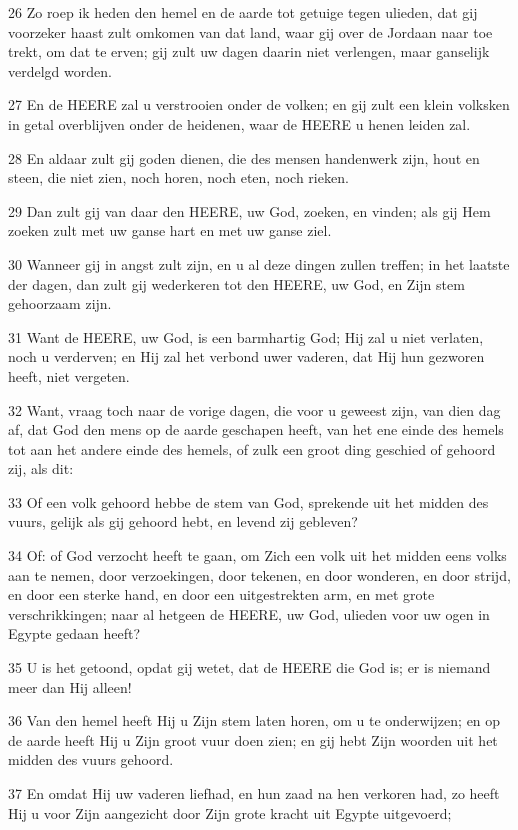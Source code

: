 \par 26 Zo roep ik heden den hemel en de aarde tot getuige tegen ulieden, dat gij voorzeker haast zult omkomen van dat land, waar gij over de Jordaan naar toe trekt, om dat te erven; gij zult uw dagen daarin niet verlengen, maar ganselijk verdelgd worden.
\par 27 En de HEERE zal u verstrooien onder de volken; en gij zult een klein volksken in getal overblijven onder de heidenen, waar de HEERE u henen leiden zal.
\par 28 En aldaar zult gij goden dienen, die des mensen handenwerk zijn, hout en steen, die niet zien, noch horen, noch eten, noch rieken.
\par 29 Dan zult gij van daar den HEERE, uw God, zoeken, en vinden; als gij Hem zoeken zult met uw ganse hart en met uw ganse ziel.
\par 30 Wanneer gij in angst zult zijn, en u al deze dingen zullen treffen; in het laatste der dagen, dan zult gij wederkeren tot den HEERE, uw God, en Zijn stem gehoorzaam zijn.
\par 31 Want de HEERE, uw God, is een barmhartig God; Hij zal u niet verlaten, noch u verderven; en Hij zal het verbond uwer vaderen, dat Hij hun gezworen heeft, niet vergeten.
\par 32 Want, vraag toch naar de vorige dagen, die voor u geweest zijn, van dien dag af, dat God den mens op de aarde geschapen heeft, van het ene einde des hemels tot aan het andere einde des hemels, of zulk een groot ding geschied of gehoord zij, als dit:
\par 33 Of een volk gehoord hebbe de stem van God, sprekende uit het midden des vuurs, gelijk als gij gehoord hebt, en levend zij gebleven?
\par 34 Of: of God verzocht heeft te gaan, om Zich een volk uit het midden eens volks aan te nemen, door verzoekingen, door tekenen, en door wonderen, en door strijd, en door een sterke hand, en door een uitgestrekten arm, en met grote verschrikkingen; naar al hetgeen de HEERE, uw God, ulieden voor uw ogen in Egypte gedaan heeft?
\par 35 U is het getoond, opdat gij wetet, dat de HEERE die God is; er is niemand meer dan Hij alleen!
\par 36 Van den hemel heeft Hij u Zijn stem laten horen, om u te onderwijzen; en op de aarde heeft Hij u Zijn groot vuur doen zien; en gij hebt Zijn woorden uit het midden des vuurs gehoord.
\par 37 En omdat Hij uw vaderen liefhad, en hun zaad na hen verkoren had, zo heeft Hij u voor Zijn aangezicht door Zijn grote kracht uit Egypte uitgevoerd;
